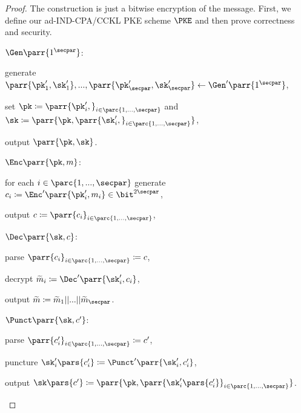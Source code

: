 \begin{proof}
    The construction is just a bitwise encryption of the message.
    First, we define our ad-IND-CPA/CCKL PKE scheme \(\PKE\) and then prove correctness and security.
    \begin{sitemize}
        \item \(\Gen\parr{1^\secpar}\):
        \begin{sitemize}
            \item generate \(\parr{\pk'_1,\sk'_1}, ..., \parr{\pk'_\secpar,\sk'_\secpar} \gets \Gen'\parr{1^{\secpar}}\),
            \item set \(\pk \coloneqq \parr{\pk'_i,}_{i \in \parc{1,...,\secpar}}\) and \(\sk \coloneqq \parr{\pk,\parr{\sk'_i,}_{i \in \parc{1,...,\secpar}}}\),
            \item output \(\parr{\pk,\sk}\).
        \end{sitemize}

        \item \(\Enc\parr{\pk,m}\):
        \begin{sitemize}
            \item for each \(i \in \parc{1,...,\secpar}\) generate \(c_i \coloneqq \Enc'\parr{\pk'_i,m_i} \in \bit^{2\secpar}\),
            \item output \(c \coloneqq \parr{c_i}_{i \in \parc{1,...,\secpar}}\),
        \end{sitemize}

        \item \(\Dec\parr{\sk,c}\):
        \begin{sitemize}
            \item parse \(\parr{c_i}_{i \in \parc{1,...,\secpar}} \coloneqq c\),
            \item decrypt \(\widetilde{m}_i \coloneqq \Dec'\parr{\sk'_i,c_i}\),
            \item output \(\widetilde{m} \coloneqq \widetilde{m}_1||...||\widetilde{m}_\secpar\).
        \end{sitemize}

        \item \(\Punct\parr{\sk, c'}\):
        \begin{sitemize}
            \item parse \(\parr{c'_i}_{i \in \parc{1,...,\secpar}} \coloneqq c'\),
            \item puncture \(\sk'_i\pars{c'_i} \coloneqq \Punct'\parr{\sk'_i,c'_i}\),
            \item output \(\sk\pars{c'} \coloneqq \parr{\pk,\parr{\sk'_i\pars{c'_i}}_{i \in \parc{1,...,\secpar}}}\).
        \end{sitemize}


\end{sitemize}
\end{proof}
